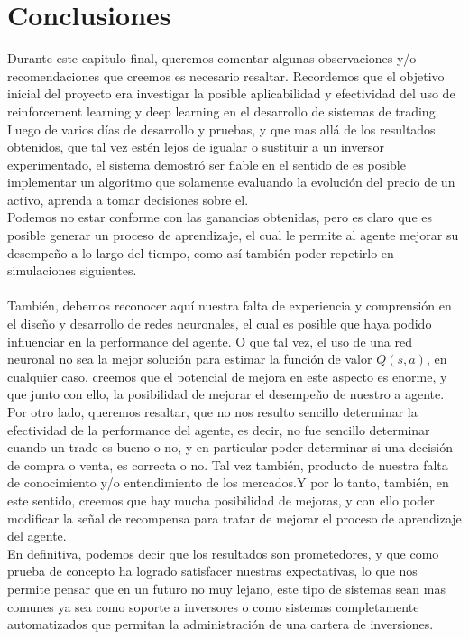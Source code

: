 \chapter{Conclusiones}

Durante este capitulo final, queremos comentar algunas observaciones y/o recomendaciones que creemos es necesario resaltar.
Recordemos que el objetivo inicial del proyecto era investigar la posible aplicabilidad y efectividad del uso de reinforcement learning y deep learning en el desarrollo de sistemas de trading. Luego de varios días de desarrollo y pruebas, y que mas allá de los resultados obtenidos, que tal vez estén lejos de igualar o sustituir a un inversor experimentado, el sistema demostró ser fiable en el sentido de es posible implementar un algoritmo que solamente evaluando la evolución del precio de un activo, aprenda a tomar decisiones sobre el.\\ Podemos no estar conforme con las ganancias obtenidas, pero es claro que es posible generar un proceso de aprendizaje, el cual le permite al agente mejorar su desempeño a lo largo del tiempo, como así también poder repetirlo en simulaciones siguientes.
\\\\
También, debemos reconocer aquí nuestra falta de experiencia y comprensión en el diseño y desarrollo de redes neuronales, el cual es posible que haya podido influenciar en la performance del agente. O que tal vez, el uso de una red neuronal no sea la mejor solución para estimar la función de valor $Q(s, a)$, en cualquier caso, creemos que el potencial de mejora en este aspecto es enorme, y que junto con ello, la posibilidad de mejorar el desempeño de nuestro a agente.\\

Por otro lado, queremos resaltar, que no nos resulto sencillo determinar la efectividad de la performance del agente, es decir, no fue sencillo determinar cuando un trade es bueno o no, y en particular poder determinar si una decisión de compra o venta, es correcta o no. Tal vez también, producto de nuestra falta de conocimiento y/o entendimiento de los mercados.Y por lo tanto, también, en este sentido, creemos que hay mucha posibilidad de mejoras, y con ello poder modificar la señal de recompensa para tratar de mejorar el proceso de aprendizaje del agente.\\

En definitiva, podemos decir que los resultados son prometedores, y que como prueba de concepto ha logrado satisfacer nuestras expectativas, lo que nos permite pensar que en un futuro no muy lejano, este tipo de sistemas sean mas comunes ya sea como soporte a inversores o como sistemas completamente automatizados que permitan la administración de una cartera de inversiones.